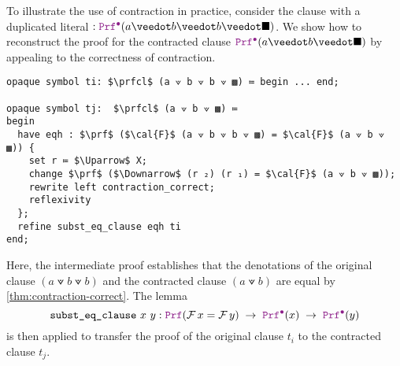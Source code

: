 \begin{example}[Contraction]
To illustrate the use of contraction in practice, consider the clause with a duplicated literal $: \prfcl (a \veedot b \veedot b \veedot \nil)$.
We show how to reconstruct the proof for the contracted clause $\prfcl (a \veedot b \veedot \nil)$ by appealing to the correctness of contraction.

\begin{lstlisting}[language=Lambdapi,mathescape=true,]
opaque symbol ti: $\prfcl$ (a ⟇ b ⟇ b ⟇ ▩) ≔ begin ... end;

opaque symbol tj:  $\prfcl$ (a ⟇ b ⟇ ▩) ≔
begin
  have eqh : $\prf$ ($\cal{F}$ (a ⟇ b ⟇ b ⟇ ▩) = $\cal{F}$ (a ⟇ b ⟇ ▩)) {
    set r ≔ $\Uparrow$ X;
    change $\prf$ ($\Downarrow$ (r ₂) (r ₁) = $\cal{F}$ (a ⟇ b ⟇ ▩));
    rewrite left contraction_correct;
    reflexivity
  };
  refine subst_eq_clause eqh ti
end;
\end{lstlisting}
Here, the intermediate proof  establishes that the denotations of the original clause
$(a \veedot b \veedot b)$ and the contracted clause $(a \veedot b)$ are equal by \cref{thm:contraction-correct}.
The lemma
\[
  \kw{subst\_eq\_clause}~x~y: 
    \prf(\cal{F}\,x = \cal{F}\,y)
    \;\ra\; \prfcl(x) \;\ra\; \prfcl(y)
\]
is then applied to transfer the proof of the original clause $t_i$ to the contracted clause $t_j$.
\end{example}